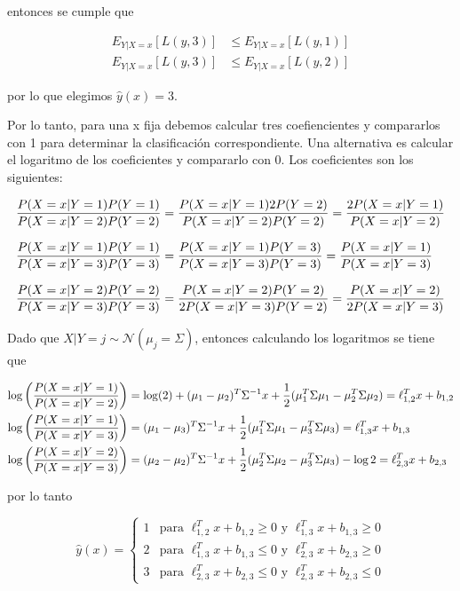 entonces se cumple que

\begin{align*}
    E_{Y|X=x} [L(y,3)] & \leq E_{Y|X=x} [L(y,1)] \\
    E_{Y|X=x} [L(y,3)] & \leq E_{Y|X=x} [L(y,2)]
\end{align*}

por lo que elegimos $\hat{y}(x)=3$.


Por lo tanto, para una x fija debemos calcular tres coefiencientes y compararlos con 1 para determinar la clasificación correspondiente. Una alternativa es calcular el logaritmo de los coeficientes y compararlo con 0. Los coeficientes son los siguientes:

\begin{align*}
    \frac{P(X=x|Y=1)P(Y=1)}{P(X=x|Y=2)P(Y=2)} & = \frac{P(X=x|Y=1)2P(Y=2)}{P(X=x|Y=2)P(Y=2)}  = \frac{2P(X=x|Y=1)}{P(X=x|Y=2)} \\[0.25cm]
    \frac{P(X=x|Y=1)P(Y=1)}{P(X=x|Y=3)P(Y=3)} & = \frac{P(X=x|Y=1)P(Y=3)}{P(X=x|Y=3)P(Y=3)}   = \frac{P(X=x|Y=1)}{P(X=x|Y=3)}  \\[0.25cm]
    \frac{P(X=x|Y=2)P(Y=2)}{P(X=x|Y=3)P(Y=3)} & = \frac{P(X=x|Y=2)P(Y=2)}{2P(X=x|Y=3)P(Y=2)}  = \frac{P(X=x|Y=2)}{2P(X=x|Y=3)}
\end{align*}

Dado que $X|Y =j \sim \mathcal{N}(\mu_j=\Sigma)$, entonces calculando los logaritmos se tiene que

\begin{align*}
    \log\left (\frac{P(X=x|Y=1)}{P(X=x|Y=2)} \right ) & = \log (2) + (\mu_1-\mu_2)^T\Sigma^{-1}x+ \frac{1}{2}(\mu_1^T\Sigma\mu_1-\mu_2^T\Sigma\mu_2) = \ell_{1,2}^Tx + b_{1,2} \\
    \log\left (\frac{P(X=x|Y=1)}{P(X=x|Y=3)} \right ) & = (\mu_1-\mu_3)^T\Sigma^{-1}x+ \frac{1}{2}(\mu_1^T\Sigma\mu_1-\mu_3^T\Sigma\mu_3)    =\ell_{1,3}^Tx + b_{1,3}          \\
    \log\left (\frac{P(X=x|Y=2)}{P(X=x|Y=3)} \right ) & = (\mu_2-\mu_2)^T\Sigma^{-1}x+ \frac{1}{2}(\mu_2^T\Sigma\mu_2-\mu_3^T\Sigma\mu_3) -\log 2 = \ell_{2,3}^Tx + b_{2,3}
\end{align*}

por lo tanto

\begin{equation*}
    \hat{y}(x) = \begin{cases}
        1 & \text{para  } \ell_{1,2}^Tx + b_{1,2} \geq 0 \text{  y  } \ell_{1,3}^Tx + b_{1,3} \geq 0 \\
        2 & \text{para  } \ell_{1,3}^Tx + b_{1,3} \leq 0 \text{  y  } \ell_{2,3}^Tx + b_{2,3} \geq 0 \\
        3 & \text{para  } \ell_{2,3}^Tx + b_{2,3} \leq 0 \text{  y  } \ell_{2,3}^Tx + b_{2,3} \leq 0
    \end{cases}
\end{equation*}